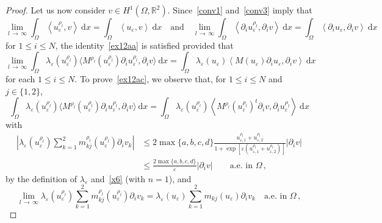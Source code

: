 \documentclass[10pt]{amsart}
\theoremstyle{definition}\newtheorem{defi}[theo]{Definition}\newtheorem{rema}[theo]{Remark}\newtheorem{exam}[theo]{Example}\newtheorem{exem}[theo]{Example}\newtheorem{nota}[theo]{Notation}
\newcommand{\bbR}{\mathbb{R}}
\newcommand{\rmd}{\mathrm{d}}
\begin{document}
\begin{proof}
Let us now consider $v\in H^1(\Omega,\bbR^2)$. Since~\eqref{conv1} and~\eqref{conv3} imply that
\begin{equation*}
\lim_{l\,\to\,\infty} \int_\Omega \left\langle u_{\varepsilon}^{\rho_l}, v \right\rangle\ \rmd x = \int_\Omega \left\langle u_{\varepsilon}, v \right\rangle\ \rmd x
\quad\text{and}\quad \lim_{l\,\to\,\infty} \int_\Omega \left\langle \partial_i u_{\varepsilon}^{\rho_l}, \partial_i v \right\rangle \ \rmd x = \int_\Omega \left\langle \partial_i u_{\varepsilon}, \partial_i v \right\rangle \ \rmd x
\end{equation*}
for $1\le i \le N$, the identity~\eqref{ex12aa} is satisfied provided that
\begin{equation}\label{ex12ac}
\lim_{l\,\to\,\infty} \int_\Omega \lambda_\varepsilon(u_{\varepsilon}^{\rho_l}) \big\langle M^{\rho_l}(u_{\varepsilon}^{\rho_l}) \partial_i u_{\varepsilon}^{\rho_l}, \partial_i v \big\rangle \ \rmd x = \int_\Omega \lambda_\varepsilon(u_{\varepsilon})\left\langle M(u_{\varepsilon}) \partial_i u_{\varepsilon}, \partial_i v \right\rangle\ \rmd x 
\end{equation}
for each $1\leq i\leq N$. To prove~\eqref{ex12ac}, we observe that, for $1\leq i\leq N$ and $j\in\{1,2\}$,
\begin{equation}\label{x7}
\int_\Omega \lambda_\varepsilon(u_\varepsilon^{\rho_l}) \big\langle M^{\rho_l}(u_{\varepsilon}^{\rho_l}) \partial_i u_{\varepsilon}^{\rho_l}, \partial_i v \big\rangle \ \rmd x = \int_\Omega \lambda_\varepsilon(u_\varepsilon^{\rho_l}) \left\langle M^{\rho_l}(u_{\varepsilon}^{\rho_l})^t \partial_i v, \partial_i u_{\varepsilon}^{\rho_l} \right\rangle \ \rmd x 
\end{equation}
with
\begin{align*}
\left| \lambda_\varepsilon(u_\varepsilon^{\rho_l}) \sum_{k=1}^2 m_{kj}^{\rho_l}(u_{\varepsilon}^{\rho_l}) \partial_i v_k \right| & \le 2\max\{a,b,c,d\} \frac{u_{\varepsilon,1}^{\rho_l} + u_{\varepsilon,2}^{\rho_l}}{1+ \exp\left[\varepsilon\left(u_{\varepsilon,1}^{\rho_l} + u_{\varepsilon,2}^{\rho_l}\right)\right]} |\partial_i v| \\
&\le \frac{2\max\{a,b,c,d\} }{\varepsilon} |\partial_i v| \qquad\text{a.e. in $\Omega$}\,,
\end{align*}
by the definition of $\lambda_\varepsilon$ and~\eqref{x6} (with $n=1$), and
\begin{equation*}
\lim_{l\,\to\,\infty} \lambda_\varepsilon(u_\varepsilon^{\rho_l}) \sum_{k=1}^2 m_{kj}^{\rho_l}(u_{\varepsilon}^{\rho_l}) \partial_i v_k = \lambda_\varepsilon(u_\varepsilon) \sum_{k=1}^2 m_{ kj}(u_{\varepsilon}) \partial_i v_k \quad\text{a.e. in $\Omega$}\,,

\end{equation*}
\end{proof}
\end{document}
